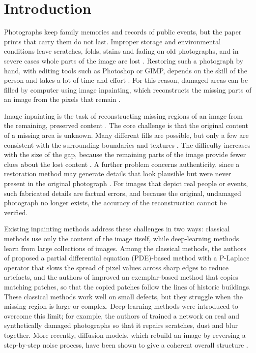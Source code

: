 \documentclass[conference]{IEEEtran}
\begin{document}
\section{Introduction}

Photographs keep family memories and records of public events, but the paper prints that carry them do not last. Improper storage and environmental conditions leave scratches, folds, stains and fading on old photographs, and in severe cases whole parts of the image are lost \cite{kuo2022}. Restoring such a photograph by hand, with editing tools such as Photoshop or GIMP, depends on the skill of the person and takes a lot of time and effort \cite{kuo2022}. For this reason, damaged areas can be filled by computer using image inpainting, which reconstructs the missing parts of an image from the pixels that remain \cite{kuo2022,wang2026}.

Image inpainting is the task of reconstructing missing regions of an image from the remaining, preserved content \cite{kuo2022,wang2026}. The core challenge is that the original content of a missing area is unknown. Many different fills are possible, but only a few are consistent with the surrounding boundaries and textures \cite{wang2026}. The difficulty increases with the size of the gap, because the remaining parts of the image provide fewer clues about the lost content \cite{wang2026}. A further problem concerns authenticity, since a restoration method may generate details that look plausible but were never present in the original photograph \cite{peng2026dcadif}. For images that depict real people or events, such fabricated details are factual errors, and because the original, undamaged photograph no longer exists, the accuracy of the reconstruction cannot be verified.

Existing inpainting methods address these challenges in two ways: classical methods use only the content of the image itself, while deep-learning methods learn from large collections of images. Among the classical methods, the authors of \cite{xiao2024} proposed a partial differential equation (PDE)-based method with a P-Laplace operator that slows the spread of pixel values across sharp edges to reduce artefacts, and the authors of \cite{xie2022} improved an exemplar-based method that copies matching patches, so that the copied patches follow the lines of historic buildings. These classical methods work well on small defects, but they struggle when the missing region is large or complex. Deep-learning methods were introduced to overcome this limit; for example, the authors of \cite{wan2023} trained a network on real and synthetically damaged photographs so that it repairs scratches, dust and blur together. More recently, diffusion models, which rebuild an image by reversing a step-by-step noise process, have been shown to give a coherent overall structure \cite{wang2026}.
\end{document}
